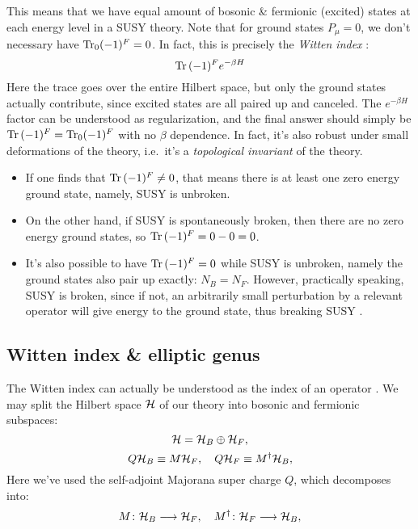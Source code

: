 \documentclass[a4paper
	,10pt
]{article}
\begin{document}
	This means that we have equal amount of bosonic \& fermionic (excited) states at each energy level in a SUSY theory. 
	Note that for ground states $P_\mu = 0$, we don't necessary have $\Tr_0 (-1)^F = 0$. In fact, this is precisely the \textit{Witten index} \cite{Witten:1982df}:
	\begin{equation}
		\Tr\,(-1)^F e^{-\beta H}
	\end{equation}
	Here the trace goes over the entire Hilbert space, but only the ground states actually contribute, since excited states are all paired up and canceled. The $e^{-\beta H}$ factor can be understood as regularization, and the final answer should simply be $\Tr\,(-1)^F = \Tr_0 (-1)^F$ with no $\beta$ dependence. In fact, it's also robust under small deformations of the theory, i.e.\ it's a \textit{topological invariant} of the theory. 
	
	\begin{itemize}
	\item If one finds that $\Tr\,(-1)^F \ne 0$, that means there is at least one zero energy ground state, namely, SUSY is unbroken. 
	
	\item On the other hand, if SUSY is spontaneously broken, then there are no zero energy ground states, so $\Tr\,(-1)^F = 0 - 0 = 0$. 
	
	\item It's also possible to have $\Tr\,(-1)^F = 0$ while SUSY is unbroken, namely the ground states also pair up exactly: $N_B = N_F$. However, practically speaking, SUSY is broken, since if not, an arbitrarily small perturbation by a relevant operator will give energy to the ground state, thus breaking SUSY \cite{Argyres:1996abc}. 
	\end{itemize}
	
\subsection{Witten index \& elliptic genus}
	
	The Witten index can actually be understood as the index of an operator \cite{Witten:1982df}. We may split the Hilbert space $\mathcal{H}$ of our theory into bosonic and fermionic subspaces:
	\begin{equation}
		\mathcal{H} = \mathcal{H}_B \oplus \mathcal{H}_F,
	\end{equation}
	\vspace{-\baselineskip}
	\begin{equation}
		Q\mathcal{H}_B \equiv M\mathcal{H}_F,
	\quad
		Q\mathcal{H}_F \equiv M^\dagger\mathcal{H}_B,
	\end{equation}
	Here we've used the self-adjoint Majorana super charge $Q$, which decomposes into:
	\begin{equation}
		M\colon \mathcal{H}_B \longrightarrow \mathcal{H}_F,
	\quad
		M^\dagger\colon \mathcal{H}_F \longrightarrow \mathcal{H}_B,
	\end{equation}
	
\end{document}
